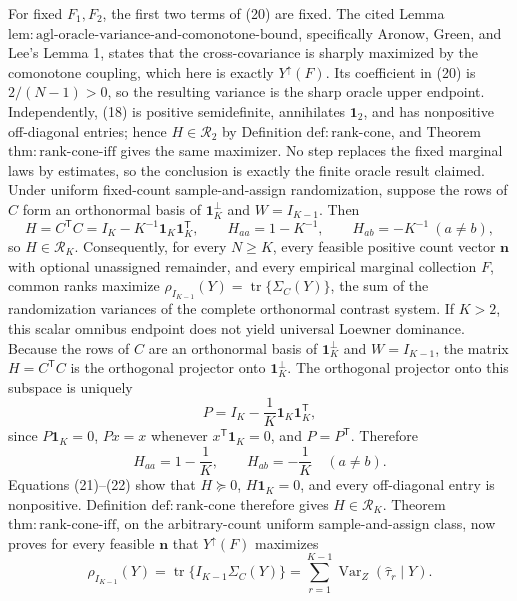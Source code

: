 For fixed \(F_1,F_2\), the first two terms of (20) are fixed.  The cited Lemma \(\mathrm{lem{:}agl\text{-}oracle\text{-}variance\text{-}and\text{-}comonotone\text{-}bound}\), specifically Aronow, Green, and Lee's Lemma 1, states that the cross-covariance is sharply maximized by the comonotone coupling, which here is exactly \(Y^{\uparrow}(F)\).  Its coefficient in (20) is \(2/(N-1)>0\), so the resulting variance is the sharp oracle upper endpoint.  Independently, (18) is positive semidefinite, annihilates \(\mathbf 1_2\), and has nonpositive off-diagonal entries; hence \(H\in\mathcal R_2\) by Definition \(\mathrm{def{:}rank\text{-}cone}\), and Theorem \(\mathrm{thm{:}rank\text{-}cone\text{-}iff}\) gives the same maximizer.  No step replaces the fixed marginal laws by estimates, so the conclusion is exactly the finite oracle result claimed.
Under uniform fixed-count sample-and-assign randomization, suppose the rows of \(C\) form an orthonormal basis of \(\mathbf 1_K^{\perp}\) and \(W=I_{K-1}\).  Then
\[
H=C^{\mathsf T}C=I_K-K^{-1}\mathbf 1_K\mathbf 1_K^{\mathsf T},
\qquad H_{aa}=1-K^{-1},\qquad H_{ab}=-K^{-1}\ (a\ne b),
\]
so \(H\in\mathcal R_K\).  Consequently, for every \(N\geq K\), every feasible positive count vector \(\mathbf n\) with optional unassigned remainder, and every empirical marginal collection \(F\), common ranks maximize
\(\rho_{I_{K-1}}(Y)=\operatorname{tr}\{\Sigma_C(Y)\}\), the sum of the randomization variances of the complete orthonormal contrast system.  If \(K>2\), this scalar omnibus endpoint does not yield universal Loewner dominance.
Because the rows of \(C\) are an orthonormal basis of \(\mathbf 1_K^{\perp}\) and \(W=I_{K-1}\), the matrix \(H=C^{\mathsf T}C\) is the orthogonal projector onto \(\mathbf 1_K^{\perp}\).  The orthogonal projector onto this subspace is uniquely
\[
P=I_K-\frac1K\mathbf 1_K\mathbf 1_K^{\mathsf T}, \tag{21}
\]
since \(P\mathbf 1_K=0\), \(Px=x\) whenever \(x^{\mathsf T}\mathbf 1_K=0\), and \(P=P^{\mathsf T}\).  Therefore
\[
H_{aa}=1-\frac1K,
\qquad H_{ab}=-\frac1K\quad(a\ne b). \tag{22}
\]
Equations (21)--(22) show that \(H\succeq0\), \(H\mathbf 1_K=0\), and every off-diagonal entry is nonpositive.  Definition \(\mathrm{def{:}rank\text{-}cone}\) therefore gives \(H\in\mathcal R_K\).  Theorem \(\mathrm{thm{:}rank\text{-}cone\text{-}iff}\), on the arbitrary-count uniform sample-and-assign class, now proves for every feasible \(\mathbf n\) that \(Y^{\uparrow}(F)\) maximizes
\[
\rho_{I_{K-1}}(Y)=\operatorname{tr}\{I_{K-1}\Sigma_C(Y)\}
=\sum_{r=1}^{K-1}\operatorname{Var}_Z(\widehat\tau_r\mid Y). \tag{23}
\]
